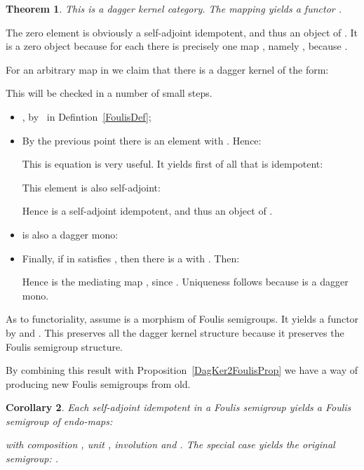 \documentclass{article}
\newtheorem{theorem}{Theorem}
\newtheorem{corollary}[theorem]{Corollary}
\newenvironment{proof}[1][Proof]{ \begin{trivlist}\item[\hskip \labelsep {\bfseries #1}]}{ \end{trivlist}}
\newcommand{\QED}{\hspace*{\fill}}
\begin{document}
\begin{theorem}
\label{Foulis2DagKerThm}
This  is a dagger kernel category. The mapping
 yields a functor .
\end{theorem}


\begin{proof}
The zero element  is obviously a self-adjoint
idempotent, and thus an object of . It is a zero
object because for each  there is precisely one
map , namely , because .

For an arbitrary map  in 
we claim that there is a dagger kernel of the form:


\noindent This will be checked in a number of small steps.
\begin{itemize}
\item ,
by~ in Defintion~\ref{FoulisDef};

\item By the previous point there is an element  with
. Hence:


\noindent This is equation is very useful. It yields first of all that
 is idempotent:


\noindent This element is also self-adjoint:


\noindent Hence  is a self-adjoint idempotent, and
thus an object of .

\item  is also a dagger mono:


\item Finally, if  in 
  satisfies , then there is a 
  with . Then:


\noindent Hence  is the mediating map ,
since . Uniqueness follows because  is a dagger mono.
\end{itemize}

As to functoriality, assume  is a morphism of
Foulis semigroups. It yields a functor  by  and .
This  preserves all the dagger kernel structure because it
preserves the Foulis semigroup structure. \QED
\end{proof}


By combining this result with Proposition~\ref{DagKer2FoulisProp}
we have a way of producing new Foulis semigroups from old.


\begin{corollary}
\label{FoulisEndoCor}
Each self-adjoint idempotent  in a Foulis semigroup  yields
a Foulis semigroup of endo-maps:


\noindent with composition , unit , involution  and
. The special case  yields the original semigroup:
.
\end{corollary}
\end{document}
